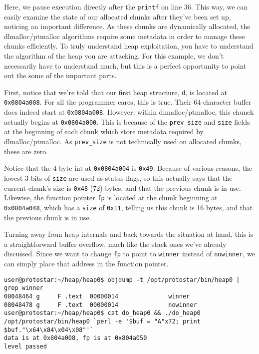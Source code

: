 Here, we pause execution directly after the \texttt{printf} on line 36.
This way, we can easily examine the state of our allocated chunks
after they've been set up, noticing an important difference. As these
chunks are dynamically allocated, the dlmalloc/ptmalloc algorithms
require some metadata in order to manage these chunks efficiently.
To truly understand heap exploitation, you have to understand the algorithm
of the heap you are attacking. For this example, we don't necessarily
have to understand much, but this is a perfect opportunity to point out the
some of the important parts.

First, notice that we're told that our first heap structure, \texttt{d},
is located at \texttt{0x0804a008}. For all the programmer cares, this is
true. Their 64-character buffer does indeed start at \texttt{0x0804a008}.
However, within dlmalloc/ptmalloc, this chunck actually begins at 
\texttt{0x0804a000}. This is because of the \texttt{prev\_size} and
\texttt{size} fields at the beginning of each chunk which store
metadata required by dlmalloc/ptmalloc. As \texttt{prev\_size} is
not technically used on allocated chunks, these are zero.

Notice that the 4-byte int at \texttt{0x0804a004} is \texttt{0x49}.
Because of various reasons, the lowest 3
bits of \texttt{size} are used as status flags, so this actually
says that the current chunk's size is \texttt{0x48} (72) bytes, and
that the previous chunk is in use. Likewise, the function
pointer \texttt{fp} is located at the chunk beginning at
\texttt{0x0804a048}, which has a \texttt{size} of \texttt{0x11},
telling us this chunk is 16 bytes, and that the previous chunk is in use. 

Turning away from heap internals and back towards the situation at hand,
this is a straightforward buffer overflow, much like the stack ones we've
already discussed. Since we want to change \texttt{fp} to point to
\texttt{winner} instead of \texttt{nowinner}, we can simply place that
address in the function pointer.

\begin{lstlisting}
user@protostar:~/heap/heap0$ objdump -t /opt/protostar/bin/heap0 | grep winner
08048464 g     F .text  00000014              winner
08048478 g     F .text  00000014              nowinner
user@protostar:~/heap/heap0$ cat do_heap0 && ./do_heap0
/opt/protostar/bin/heap0 `perl -e '$buf = "A"x72; print $buf."\x64\x84\x04\x08"'`
data is at 0x804a008, fp is at 0x804a050
level passed
\end{lstlisting}

